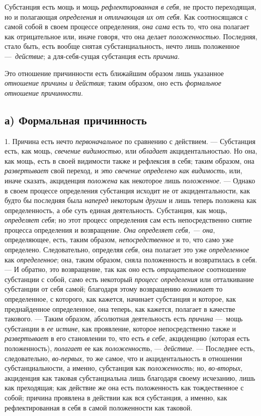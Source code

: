 Субстанция есть мощь и мощь
{\em рефлектированная в себя}, не просто переходящая,
но и полагающая {\em определения} и
{\em отличающая их от себя}. Как соотносящаяся с самой
собой в своем процессе определения, {\em она сама} есть
то, что она полагает как отрицательное или, иначе говоря, что она делает
{\em положенностью}. Последняя, стало быть, есть вообще
снятая субстанциальность, нечто лишь положенное
—~{\em действие}; а для-себя-сущая субстанция есть
{\em причина}.

Это отношение причинности есть ближайшим образом лишь указанное
{\em отношение причины и действия}; таким образом, оно
есть {\em формальное отношение причинности}.


\subsection[а) Формальная причинность]{а) Формальная причинность}

1. Причина есть нечто
{\em первоначальное} по сравнению с действием. —
Субстанция есть, как мощь, {\em свечение видимостью},
или {\em обладает} акцидентальностью. Но она, как мощь,
есть в своей видимости также и рефлексия в себя; таким образом, она
{\em развертывает} свой переход, и
{\em это свечение определено как видимость}, или, иначе
сказать, акциденция {\em положена} как некоторое лишь
{\em положенное}. — Однако в своем процессе определения
субстанция исходит не от акцидентальности, как будто бы последняя была
{\em наперед} некоторым
{\em другим} и лишь теперь положена как определенность,
а обе суть единая деятельность. Субстанция, как мощь,
{\em определяет себя}; но этот процесс определения сам
есть непосредственно снятие процесса определения и возвращение.
{\em Она определяет себя, — она}, определяющее, есть,
таким образом, {\em непосредственное} и то, что само
уже определено. Следовательно, определяя {\em себя},
она полагает это уже {\em определенное} как
{\em определенное}; она, таким образом, сняла
положенность и возвратилась в себя. — И обратно, это возвращение, так как
оно есть {\em отрицательное} соотношение субстанции с
собой, само есть некоторый {\em процесс определения}
или отталкивание субстанции от себя самой; благодаря этому возвращению
{\em возникает} то определенное, с которого, как
кажется, начинает субстанция и которое, как преднайденное определенное, она
теперь, как кажется, полагает в качестве такового. — Таким образом,
абсолютная деятельность есть {\em причина} —~мощь
субстанции в {\em ее истине}, как проявление, которое
непосредственно также и {\em развертывает} в его
становлении то, что есть {\em в себе}, акциденцию
(которая есть положенность), {\em полагает} ее как
{\em положенность}, —
{\em действие}. — Последнее есть, следовательно,
{\em во-первых}, то же самое, что и акцидентальность в
отношении субстанциальности, а именно, субстанция как
{\em положенность}; но,
{\em во-вторых}, акциденция как таковая субстанциальна
лишь благодаря своему исчезанию, лишь как преходящая; как действие же она
есть положенность как тождественное с собой; причина проявлена в действии
как вся субстанция, а именно, как рефлектированная в себя в самой
положенности как таковой.


